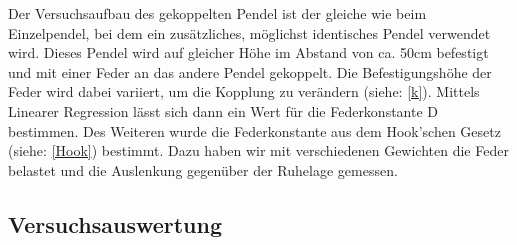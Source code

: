 \documentclass[12pt,a4paper]{article}
\begin{document}
Der Versuchsaufbau des gekoppelten Pendel ist der gleiche wie beim Einzelpendel, bei dem ein zusätzliches, möglichst identisches Pendel verwendet wird. Dieses Pendel wird auf gleicher Höhe im Abstand von ca. 50cm befestigt und mit einer Feder an das andere Pendel gekoppelt. Die Befestigungshöhe der Feder wird dabei variiert, um die Kopplung zu verändern (siehe: \ref{k}). Mittels Linearer Regression lässt sich dann ein Wert für die Federkonstante D bestimmen. \newline
Des Weiteren wurde die Federkonstante aus dem Hook'schen Gesetz (siehe: \ref{Hook}) bestimmt. Dazu haben wir mit verschiedenen Gewichten die Feder belastet und die Auslenkung gegenüber der Ruhelage gemessen.
\subsection{Versuchsauswertung}
\end{document}
